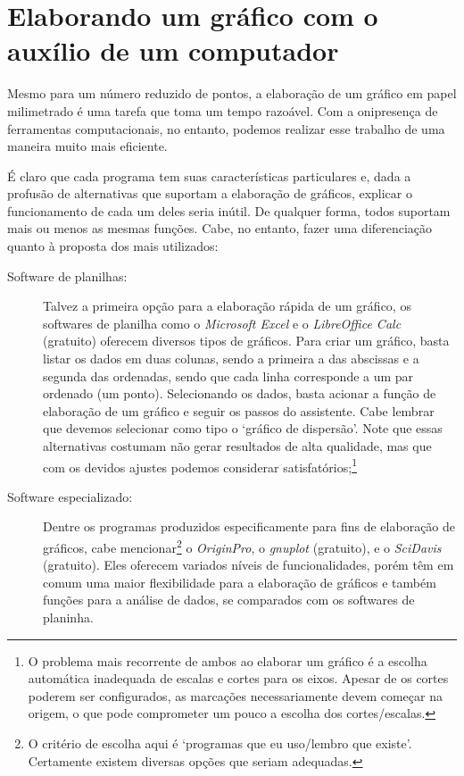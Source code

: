 \section{Elaborando um gráfico com o auxílio de um computador}
\label{Sec:SoftwareGraficos}

Mesmo para um número reduzido de pontos, a elaboração de um gráfico em papel milimetrado é uma tarefa que toma um tempo razoável. Com a onipresença de ferramentas computacionais, no entanto, podemos realizar esse trabalho de uma maneira muito mais eficiente.

É claro que cada programa tem suas características particulares e, dada a profusão de alternativas que suportam a elaboração de gráficos, explicar o funcionamento de cada um deles seria inútil. De qualquer forma, todos suportam mais ou menos as mesmas funções. Cabe, no entanto, fazer uma diferenciação quanto à proposta dos mais utilizados:
\begin{description}
    \item[Software de planilhas:] Talvez a primeira opção para a elaboração rápida de um gráfico, os softwares de planilha como o \emph{Microsoft Excel} e o \emph{LibreOffice Calc} (gratuito) oferecem diversos tipos de gráficos. Para criar um gráfico, basta listar os dados em duas colunas, sendo a primeira a das abscissas e a segunda das ordenadas, sendo que cada linha corresponde a um par ordenado (um ponto). Selecionando os dados, basta acionar a função de elaboração de um gráfico e seguir os passos do assistente. Cabe lembrar que devemos selecionar como tipo o `gráfico de dispersão'. Note que essas alternativas costumam não gerar resultados de alta qualidade, mas que com os devidos ajustes podemos considerar satisfatórios;\footnote[][-4cm]{O problema mais recorrente de ambos ao elaborar um gráfico é a escolha automática inadequada de escalas e cortes para os eixos. Apesar de os cortes poderem ser configurados, as marcações necessariamente devem começar na origem, o que pode comprometer um pouco a escolha dos cortes/escalas.}
    \item[Software especializado:] Dentre os programas produzidos especificamente para fins de elaboração de gráficos, cabe mencionar\footnote[][-1cm]{O critério de escolha aqui é `programas que eu uso/lembro que existe'. Certamente existem diversas opções que seriam adequadas.} o \emph{OriginPro}, o \emph{gnuplot} (gratuito), e o \emph{SciDavis} (gratuito). Eles oferecem variados níveis de funcionalidades, porém têm em comum uma maior flexibilidade para a elaboração de gráficos e também funções para a análise de dados, se comparados com os softwares de planinha.
\end{description}

